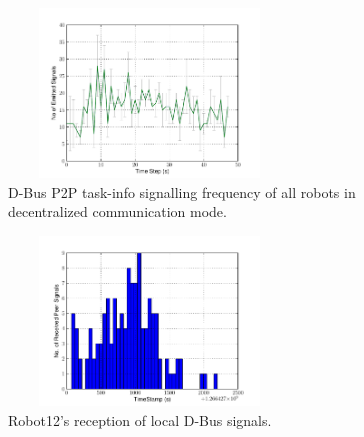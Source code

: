 \documentclass[draft]{ifacconf}
\begin{document}
\begin{figure}
\begin{center}
\includegraphics[width=7.5cm,height=4.5cm]{./images/Local-500cm-SignalingFreqStat}    %
\caption{D-Bus P2P task-info signalling frequency of all robots in decentralized communication mode.} 
\label{fig:local-freq}
\end{center}
\end{figure}
\begin{figure}
\begin{center}
\includegraphics[width=7.5cm,height=4.5cm]{./images/Robot12-17feb-3-LocalSignals}
\caption{Robot12's reception of local D-Bus signals.} 
\label{fig:robot-freq}
\end{center}
\end{figure}
\end{document}
